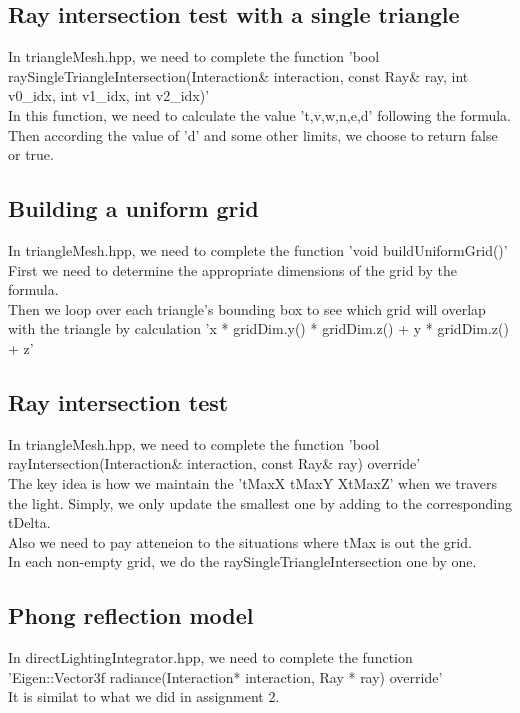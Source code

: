 \documentclass[acmtog]{acmart}
\begin{document}
\vspace*{1 ex}
\subsection{Ray intersection test with a single triangle}
In triangleMesh.hpp, we need to complete the function 'bool raySingleTriangleIntersection(Interaction\& interaction, const Ray\& ray, int v0\_idx, int v1\_idx, int v2\_idx)'
\\In this function, we need to calculate the value 't,v,w,n,e,d' following the formula. Then according the value of 'd' and some other limits, we choose to return false or true.
\vspace*{1 ex}
\subsection{Building a uniform grid}
In triangleMesh.hpp, we need to complete the function 'void buildUniformGrid()'
\\First we need to determine the appropriate dimensions of the grid by the formula.
\\Then we loop over each triangle's bounding box to see which grid will overlap with the triangle by calculation 'x * gridDim.y() * gridDim.z() + y * gridDim.z() + z'
\vspace*{1 ex}
\subsection{Ray intersection test}
In triangleMesh.hpp, we need to complete the function 'bool rayIntersection(Interaction\& interaction, const Ray\& ray) override'
\\The key idea is how we maintain the 'tMaxX tMaxY XtMaxZ' when we travers the light. Simply, we only update the smallest one by adding to the corresponding tDelta.
\\Also we need to pay atteneion to the situations where tMax is out the grid.
\\In each non-empty grid, we do the raySingleTriangleIntersection one by one.
\vspace*{1 ex}
\subsection{Phong reflection model}
In directLightingIntegrator.hpp, we need to complete the function 'Eigen::Vector3f radiance(Interaction* interaction, Ray * ray) override'
\\It is similat to what we did in assignment 2.
\end{document}
